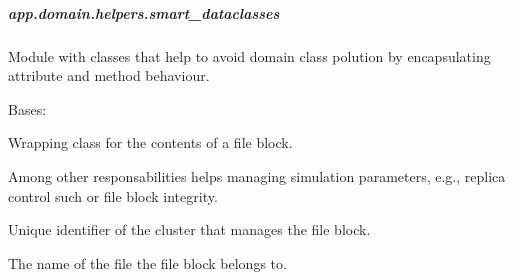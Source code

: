 \documentclass[letterpaper,10pt,english]{sphinxmanual}
\begin{document}
\subparagraph{app.domain.helpers.smart\_dataclasses}
\label{\detokenize{app.domain.helpers:module-app.domain.helpers.smart_dataclasses}}\label{\detokenize{app.domain.helpers:app-domain-helpers-smart-dataclasses}}
Module with classes that help to avoid domain class polution by
encapsulating attribute and method behaviour.

\begin{fulllineitems}
\label{\detokenize{app.domain.helpers:app.domain.helpers.smart_dataclasses.FileBlockData}}
Bases: 

Wrapping class for the contents of a file block.

Among other responsabilities  helps managing simulation
parameters, e.g., replica control such or file block integrity.

\begin{fulllineitems}
\label{\detokenize{app.domain.helpers:app.domain.helpers.smart_dataclasses.FileBlockData.cluster_id}}
Unique identifier of the cluster that manages the file block.

\end{fulllineitems}


\begin{fulllineitems}
\label{\detokenize{app.domain.helpers:app.domain.helpers.smart_dataclasses.FileBlockData.name}}
The name of the file the file block belongs to.

\end{fulllineitems}


\end{fulllineitems}
\end{document}
